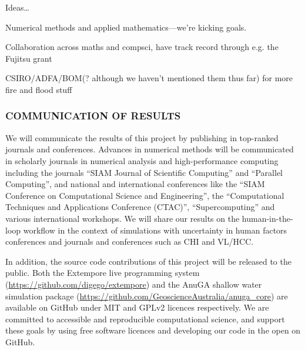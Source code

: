 \documentclass[a4paper,fontsize=12pt]{scrartcl}
\begin{document}
Ideas\ldots

Numerical methods and applied mathematics---we're kicking goals.

Collaboration across maths and compsci, have track record through e.g.
the Fujitsu grant

CSIRO/ADFA/BOM(? although we haven't mentioned them thus far) for more
fire and flood stuff

\subsubsection*{COMMUNICATION OF RESULTS}


We will communicate the results of this project by publishing in
top-ranked journals and conferences. Advances in numerical methods
will be communicated in scholarly journals in numerical analysis and
high-performance computing including the journals “SIAM Journal of
Scientific Computing” and “Parallel Computing”, and national and
international conferences like the “SIAM Conference on Computational
Science and Engineering”, the “Computational Techniques and
Applications Conference (CTAC)”, “Supercomputing” and various
international workshops. We will share our results on the
human-in-the-loop workflow in the context of simulations with
uncertainty in human factors conferences and journals and conferences
such as CHI and VL/HCC.

In addition, the source code contributions of this project will be
released to the public. Both the Extempore live programming system
(\url{https://github.com/digego/extempore}) and the AnuGA shallow
water simulation package
(\url{https://github.com/GeoscienceAustralia/anuga_core}) are
available on GitHub under MIT and GPLv2 licences respectively. We are
committed to accessible and reproducible computational science, and
support these goals by using free software licences and developing our
code in the open on GitHub.
\end{document}

